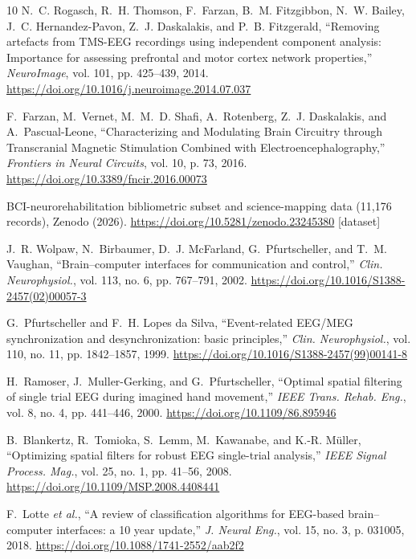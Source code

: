 \documentclass[preprint,12pt]{elsarticle}
\begin{document}
\begin{thebibliography}{10}
N.~C. Rogasch, R.~H. Thomson, F.~Farzan, B.~M. Fitzgibbon, N.~W. Bailey, J.~C. Hernandez-Pavon, Z.~J. Daskalakis, and P.~B. Fitzgerald, ``Removing artefacts from TMS-EEG recordings using independent component analysis: Importance for assessing prefrontal and motor cortex network properties,'' \emph{NeuroImage}, vol. 101, pp. 425--439, 2014. \url{https://doi.org/10.1016/j.neuroimage.2014.07.037}

F.~Farzan, M.~Vernet, M.~M.~D. Shafi, A.~Rotenberg, Z.~J. Daskalakis, and A.~Pascual-Leone, ``Characterizing and Modulating Brain Circuitry through Transcranial Magnetic Stimulation Combined with Electroencephalography,'' \emph{Frontiers in Neural Circuits}, vol. 10, p. 73, 2016. \url{https://doi.org/10.3389/fncir.2016.00073}

BCI-neurorehabilitation bibliometric subset and science-mapping data (11,176 records), Zenodo (2026). \url{https://doi.org/10.5281/zenodo.23245380} [dataset]



J.~R. Wolpaw, N.~Birbaumer, D.~J. McFarland, G.~Pfurtscheller, and T.~M. Vaughan, ``Brain--computer interfaces for communication and control,'' \emph{Clin. Neurophysiol.}, vol. 113, no. 6, pp. 767--791, 2002. \url{https://doi.org/10.1016/S1388-2457(02)00057-3}

G.~Pfurtscheller and F.~H. Lopes da Silva, ``Event-related EEG/MEG synchronization and desynchronization: basic principles,'' \emph{Clin. Neurophysiol.}, vol. 110, no. 11, pp. 1842--1857, 1999. \url{https://doi.org/10.1016/S1388-2457(99)00141-8}

H.~Ramoser, J.~Muller-Gerking, and G.~Pfurtscheller, ``Optimal spatial filtering of single trial EEG during imagined hand movement,'' \emph{IEEE Trans. Rehab. Eng.}, vol. 8, no. 4, pp. 441--446, 2000. \url{https://doi.org/10.1109/86.895946}

B.~Blankertz, R.~Tomioka, S.~Lemm, M.~Kawanabe, and K.-R. M\"uller, ``Optimizing spatial filters for robust EEG single-trial analysis,'' \emph{IEEE Signal Process. Mag.}, vol. 25, no. 1, pp. 41--56, 2008. \url{https://doi.org/10.1109/MSP.2008.4408441}

F.~Lotte \emph{et al.}, ``A review of classification algorithms for EEG-based brain--computer interfaces: a 10 year update,'' \emph{J. Neural Eng.}, vol. 15, no. 3, p. 031005, 2018. \url{https://doi.org/10.1088/1741-2552/aab2f2}


\end{thebibliography}
\end{document}
